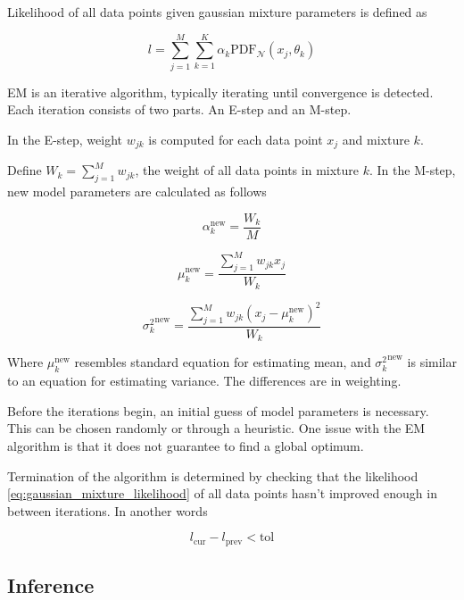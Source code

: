\documentclass[thesis=B,english]{FITthesis}[2012/06/26]
\begin{document}
Likelihood of all data points given gaussian mixture parameters is defined as

\begin{equation} \label{eq:gaussian_mixture_likelihood}
l = \sum_{j=1}^{M} \sum_{k=1}^{K} \alpha_k \text{PDF}_{\mathcal{N}}(x_j, \theta_k)
\end{equation}

EM is an iterative algorithm, typically iterating until convergence is detected. Each iteration consists of two parts. An E-step and an M-step.

In the E-step, weight $w_{jk}$ is computed for each data point $x_j$ and mixture $k$.

Define $W_k = \sum_{j=1}^{M} w_{jk}$, the weight of all data points in mixture $k$. In the M-step, new model parameters are calculated as follows

\begin{equation}
\alpha_k^{\text{new}} = \frac{W_k}{M}
\end{equation}

\begin{equation}
\mu_k^{\text{new}} = \frac{\sum_{j=1}^M w_{jk} x_j}{W_k}
\end{equation}

\begin{equation}
{\sigma_k^{2}}^{\text{new}} = \frac{\sum_{j=1}^M w_{jk} (x_j-\mu_k^{\text{new}})^2}{W_k}
\end{equation}

Where $\mu_k^{\text{new}}$ resembles standard equation for estimating mean, and 
${\sigma_k^{2}}^{\text{new}}$ is similar to an equation for estimating variance. The differences are in weighting.

Before the iterations begin, an initial guess of model parameters is necessary. This can be chosen randomly or through a heuristic. One issue with the EM algorithm is that it does not guarantee to find a global optimum.

Termination of the algorithm is determined by checking that the likelihood \ref{eq:gaussian_mixture_likelihood} of all data points hasn't improved enough in between iterations. In another words

\begin{equation}
l_{\text{cur}} - l_{\text{prev}} < \text{tol}
\end{equation}

\subsection{Inference}
\end{document}
